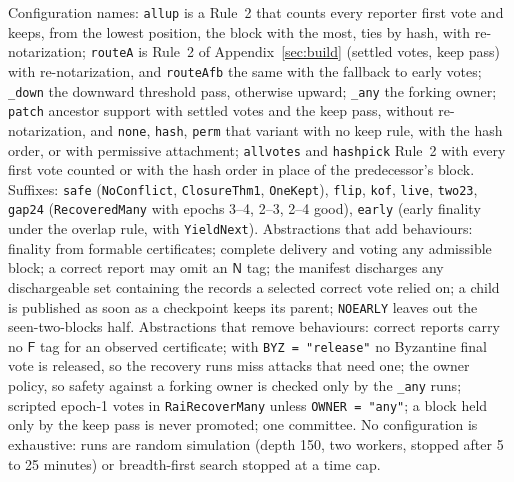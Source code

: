 \documentclass[conference]{IEEEtran}
\newcommand{\tagN}{\mathsf{N}}
\newcommand{\tagF}{\mathsf{F}}
\begin{document}
Configuration names: \texttt{allup} is a Rule~2 that counts every reporter first vote and keeps, from the lowest position, the block with the most, ties by hash, with re-notarization; \texttt{routeA} is Rule~2 of Appendix~\ref{sec:build} (settled votes, keep pass) with re-notarization, and \texttt{routeAfb} the same with the fallback to early votes; \texttt{\_down} the downward threshold pass, otherwise upward; \texttt{\_any} the forking owner; \texttt{patch} ancestor support with settled votes and the keep pass, without re-notarization, and \texttt{none}, \texttt{hash}, \texttt{perm} that variant with no keep rule, with the hash order, or with permissive attachment; \texttt{allvotes} and \texttt{hashpick} Rule~2 with every first vote counted or with the hash order in place of the predecessor's block. Suffixes: \texttt{safe} (\texttt{NoConflict}, \texttt{ClosureThm1}, \texttt{OneKept}), \texttt{flip}, \texttt{kof}, \texttt{live}, \texttt{two23}, \texttt{gap24} (\texttt{RecoveredMany} with epochs 3--4, 2--3, 2--4 good), \texttt{early} (early finality under the overlap rule, with \texttt{YieldNext}). Abstractions that add behaviours: finality from formable certificates; complete delivery and voting any admissible block; a correct report may omit an $\tagN$ tag; the manifest discharges any dischargeable set containing the records a selected correct vote relied on; a child is published as soon as a checkpoint keeps its parent; \texttt{NOEARLY} leaves out the seen-two-blocks half. Abstractions that remove behaviours: correct reports carry no $\tagF$ tag for an observed certificate; with \texttt{BYZ = "release"} no Byzantine final vote is released, so the recovery runs miss attacks that need one; the owner policy, so safety against a forking owner is checked only by the \texttt{\_any} runs; scripted epoch-1 votes in \texttt{RaiRecoverMany} unless \texttt{OWNER = "any"}; a block held only by the keep pass is never promoted; one committee. No configuration is exhaustive: runs are random simulation (depth 150, two workers, stopped after 5 to 25 minutes) or breadth-first search stopped at a time cap.
\end{document}
